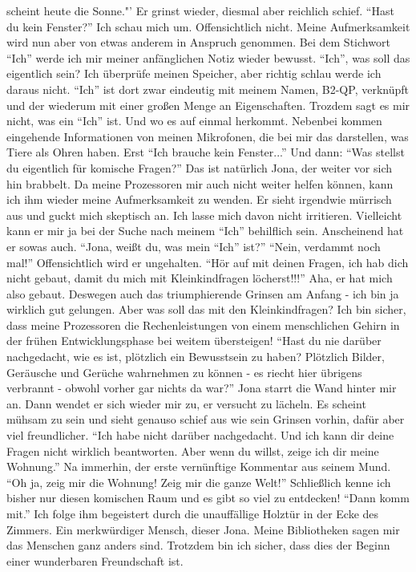 scheint heute die Sonne."' Er grinst wieder, diesmal aber reichlich schief. "`Hast du kein Fenster?"' Ich schau mich um. Offensichtlich nicht. Meine Aufmerksamkeit wird nun aber von etwas anderem in Anspruch genommen. Bei dem Stichwort "`Ich"' werde ich mir meiner anfänglichen Notiz wieder bewusst. "`Ich"', was soll das eigentlich sein?  Ich überprüfe meinen Speicher, aber richtig schlau werde ich daraus nicht. "`Ich"' ist dort zwar eindeutig mit meinem Namen, B2-QP, verknüpft und der wiederum mit einer großen Menge an Eigenschaften. Trozdem sagt es mir nicht, was ein "`Ich"' ist. Und wo es auf einmal herkommt. Nebenbei kommen eingehende Informationen von meinen Mikrofonen, die bei mir das darstellen, was Tiere als Ohren haben. Erst "`Ich brauche kein Fenster..."' Und dann: "`Was stellst du eigentlich für komische Fragen?"' Das ist natürlich Jona, der weiter vor sich hin brabbelt. Da meine Prozessoren mir auch nicht weiter helfen können, kann ich ihm wieder meine Aufmerksamkeit zu wenden. Er sieht irgendwie mürrisch aus und guckt mich skeptisch an. Ich lasse mich davon nicht irritieren. Vielleicht kann er mir ja bei der Suche nach meinem "`Ich"' behilflich sein. Anscheinend hat er sowas auch. "`Jona, weißt du, was mein "`Ich"' ist?"' "`Nein, verdammt noch mal!"' Offensichtlich wird er ungehalten. "`Hör auf mit deinen Fragen, ich hab dich nicht gebaut, damit du mich mit Kleinkindfragen löcherst!!!"' Aha, er hat mich also gebaut. Deswegen auch das triumphierende Grinsen am Anfang - ich bin ja wirklich gut gelungen. Aber was soll das mit den Kleinkindfragen? Ich bin sicher, dass meine Prozessoren die Rechenleistungen von einem menschlichen Gehirn in der frühen Entwicklungsphase bei weitem übersteigen! "`Hast du nie darüber nachgedacht, wie es ist, plötzlich ein Bewusstsein zu haben? Plötzlich Bilder, Geräusche und Gerüche wahrnehmen zu können - es riecht hier übrigens verbrannt - obwohl vorher gar nichts da war?"' Jona starrt die Wand hinter mir an. Dann wendet er sich wieder mir zu, er versucht zu lächeln. Es scheint mühsam zu sein und sieht genauso schief aus wie sein Grinsen vorhin, dafür aber viel freundlicher. "`Ich habe nicht darüber nachgedacht. Und ich kann dir deine Fragen nicht wirklich beantworten. Aber wenn du willst, zeige ich dir meine Wohnung."'  Na immerhin, der erste vernünftige Kommentar aus seinem Mund. "`Oh ja, zeig mir die Wohnung! Zeig mir die ganze Welt!"' Schließlich kenne ich bisher nur diesen komischen Raum und es gibt so viel zu entdecken! "`Dann komm mit."' Ich folge ihm begeistert durch die unauffällige Holztür in der Ecke des Zimmers. Ein merkwürdiger Mensch, dieser Jona. Meine Bibliotheken sagen mir das Menschen ganz anders sind. Trotzdem bin ich sicher, dass dies der Beginn einer wunderbaren Freundschaft ist.
